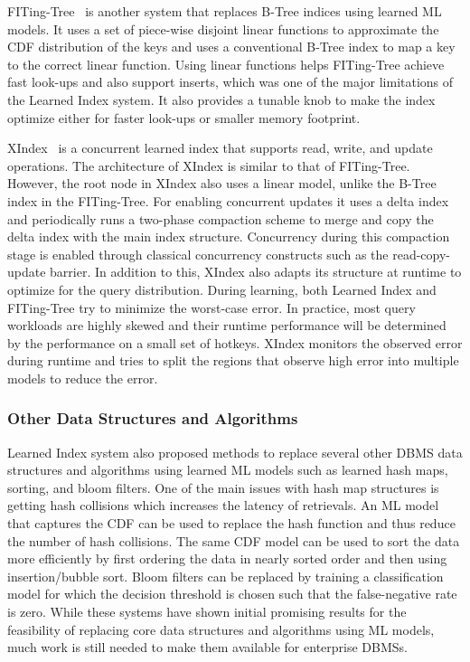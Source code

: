 FITing-Tree~\cite{fitingtree} is another system that replaces B-Tree indices using learned ML models.
It uses a set of piece-wise disjoint linear functions to approximate the CDF distribution of the keys and uses a conventional B-Tree index to map a key to the correct linear function.
Using linear functions helps FITing-Tree achieve fast look-ups and also support inserts, which was one of the major limitations of the Learned Index system.
It also provides a tunable knob to make the index optimize either for faster look-ups or smaller memory footprint.

XIndex~\cite{xindex} is a concurrent learned index that supports read, write, and update operations.
The architecture of XIndex is similar to that of FITing-Tree.
However, the root node in XIndex also uses a linear model, unlike the B-Tree index in the FITing-Tree.
For enabling concurrent updates it uses a delta index and periodically runs a two-phase compaction scheme to merge and copy the delta index with the main index structure.
Concurrency during this compaction stage is enabled through classical concurrency constructs such as the read-copy-update barrier.
In addition to this, XIndex also adapts its structure at runtime to optimize for the query distribution.
During learning, both Learned Index and FITing-Tree try to minimize the worst-case error.
In practice, most query workloads are highly skewed and their runtime performance will be determined by the performance on a small set of hotkeys.
XIndex monitors the observed error during runtime and tries to split the regions that observe high error into multiple models to reduce the error.

\subsubsection{Other Data Structures and Algorithms}
Learned Index system also proposed methods to replace several other DBMS data structures and algorithms using learned ML models such as learned hash maps, sorting, and bloom filters.
One of the main issues with hash map structures is getting hash collisions which increases the latency of retrievals.
An ML model that captures the CDF can be used to replace the hash function and thus reduce the number of hash collisions.
The same CDF model can be used to sort the data more efficiently by first ordering the data in nearly sorted order and then using insertion/bubble sort.
Bloom filters can be replaced by training a classification model for which the decision threshold is chosen such that the false-negative rate is zero.
While these systems have shown initial promising results for the feasibility of replacing core data structures and algorithms using ML models, much work is still needed to make them available for enterprise DBMSs.